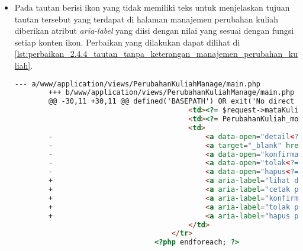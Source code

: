 \begin{itemize}
    \item Pada tautan berisi ikon yang tidak memiliki teks untuk menjelaskan tujuan tautan tersebut yang terdapat di halaman manajemen perubahan kuliah diberikan atribut \textit{aria-label} yang diisi dengan nilai yang sesuai dengan fungsi setiap konten ikon. Perbaikan yang dilakukan dapat dilihat di \ref{lst:perbaikan_2.4.4_tautan_tanpa_keterangan_manajemen_perubahan_kuliah}.
    \begin{lstlisting}[frame=single, label={lst:perbaikan_2.4.4_tautan_tanpa_keterangan_manajemen_perubahan_kuliah}, language=HTML, caption=Perbaikan Kriteria Sukses 2.4.4 - Tautan Tanpa Keterangan di Halaman Manajemen Perubahan Kuliah]
        --- a/www/application/views/PerubahanKuliahManage/main.php
        +++ b/www/application/views/PerubahanKuliahManage/main.php
        @@ -30,11 +30,11 @@ defined('BASEPATH') OR exit('No direct script access allowed');
                                         <td><?= $request->mataKuliahCode ?></td>
                                         <td><?= PerubahanKuliah_model::CHANGETYPE_TYPES[$request->changeType] ?></td>
                                         <td>
        -                                    <a data-open="detail<?= $request->id ?>"><i class="fi-eye"></i></a>
        -                                    <a target="_blank" href="/PerubahanKuliahManage/printview/<?= $request->id ?>"><i class="fi-print"></i></a>
        -                                    <a data-open="konfirmasi<?= $request->id ?>"><i class="fi-like"></i></a>                                    
        -                                    <a data-open="tolak<?= $request->id ?>"><i class="fi-dislike"></i></a>
        -                                    <a data-open="hapus<?= $request->id ?>"><i class="fi-trash"></i></a>
        +                                    <a aria-label="lihat detail permohonan" data-open="detail<?= $request->id ?>"><i class="fi-eye"></i></a>
        +                                    <a aria-label="cetak permohonan" target="_blank" href="/PerubahanKuliahManage/printview/<?= $request->id ?>"><i class="fi-print"></i></a>
        +                                    <a aria-label="konfirmasi permohonan" data-open="konfirmasi<?= $request->id ?>"><i class="fi-like"></i></a>                                    
        +                                    <a aria-label="tolak permohonan" data-open="tolak<?= $request->id ?>"><i class="fi-dislike"></i></a>
        +                                    <a aria-label="hapus permohonan" data-open="hapus<?= $request->id ?>"><i class="fi-trash"></i></a>
                                         </td>
                                     </tr>
                                 <?php endforeach; ?>
    \end{lstlisting}
\end{itemize}

